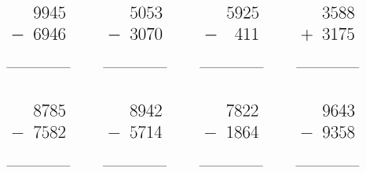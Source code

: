 \documentclass[14pt,a4paper,sans, final]{article}
\begin{document}
\[
\huge 
\begin{array}{cccc}
\begin{array}{lr}
 & 9945 \\
- & 6946 \\
&\\
\hline
&\qquad 
\end{array}\qquad

\begin{array}{lr}
 & 5053 \\
- & 3070 \\
&\\
\hline
&\qquad 
\end{array}\qquad

\begin{array}{lr}
 & 5925 \\
- & 411 \\
&\\
\hline
&\qquad 
\end{array}\qquad

\begin{array}{lr}
 & 3588 \\
+ & 3175 \\
&\\
\hline
&\qquad 
\end{array}\qquad

\end{array}
\]

\[
\huge 
\begin{array}{cccc}
\begin{array}{lr}
 & 8785 \\
- & 7582 \\
&\\
\hline
&\qquad 
\end{array}\qquad

\begin{array}{lr}
 & 8942 \\
- & 5714 \\
&\\
\hline
&\qquad 
\end{array}\qquad

\begin{array}{lr}
 & 7822 \\
- & 1864 \\
&\\
\hline
&\qquad 
\end{array}\qquad

\begin{array}{lr}
 & 9643 \\
- & 9358 \\
&\\
\hline
&\qquad 
\end{array}\qquad

\end{array}
\]
\end{document}

